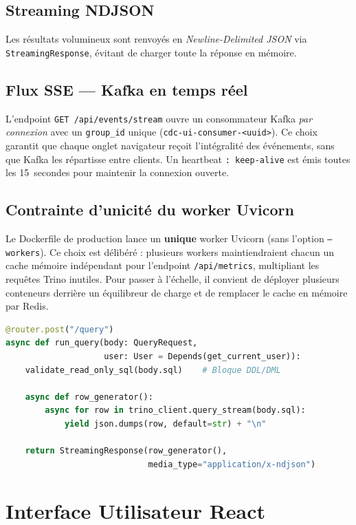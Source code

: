 \documentclass[12pt,a4paper]{report}
\begin{document}
\subsection{Streaming NDJSON}

Les résultats volumineux sont renvoyés en \textit{Newline-Delimited JSON}
via \texttt{StreamingResponse}, évitant de charger toute la réponse en mémoire.

\subsection{Flux SSE --- Kafka en temps réel}

L'endpoint \texttt{GET /api/events/stream} ouvre un consommateur Kafka
\textit{par connexion} avec un \texttt{group\_id} unique
(\texttt{cdc-ui-consumer-<uuid>}). Ce choix garantit que chaque onglet
navigateur reçoit l'intégralité des événements, sans que Kafka les
répartisse entre clients. Un heartbeat \texttt{: keep-alive} est émis
toutes les 15~secondes pour maintenir la connexion ouverte.

\subsection{Contrainte d'unicité du worker Uvicorn}

Le Dockerfile de production lance un \textbf{unique} worker Uvicorn
(sans l'option \texttt{--workers}). Ce choix est délibéré : plusieurs
workers maintiendraient chacun un cache mémoire indépendant pour l'endpoint
\texttt{/api/metrics}, multipliant les requêtes Trino inutiles. Pour
passer à l'échelle, il convient de déployer plusieurs conteneurs derrière
un équilibreur de charge et de remplacer le cache en mémoire par Redis.

\begin{lstlisting}[language=Python,
    caption={Endpoint /api/query --- streaming NDJSON}]
@router.post("/query")
async def run_query(body: QueryRequest,
                    user: User = Depends(get_current_user)):
    validate_read_only_sql(body.sql)    # Bloque DDL/DML

    async def row_generator():
        async for row in trino_client.query_stream(body.sql):
            yield json.dumps(row, default=str) + "\n"

    return StreamingResponse(row_generator(),
                             media_type="application/x-ndjson")
\end{lstlisting}

\section{Interface Utilisateur React}
\end{document}
